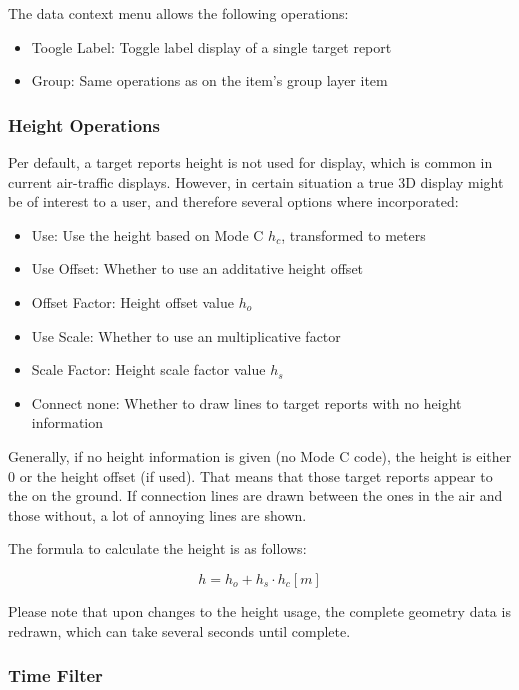 \documentclass[10pt,letterpaper,extrafontsizes]{memoir}
\begin{document}
{The data context menu allows the following operations:

\begin{itemize}
 \item Toogle Label: Toggle label display of a single target report
 \item Group: Same operations as on the item's group layer item
\end{itemize}

\subsubsection{Height Operations}

Per default, a target reports height is not used for display, which is common in current air-traffic displays. However, in certain situation a true 3D display might be of interest to a user, and therefore several options where incorporated:

\begin{itemize}
 \item Use: Use the height based on Mode C $h_c$, transformed to meters
 \item Use Offset: Whether to use an additative height offset
 \item Offset Factor: Height offset value $h_o$
 \item Use Scale: Whether to use an multiplicative factor
 \item Scale Factor: Height scale factor value $h_s$
 \item Connect none: Whether to draw lines to target reports with no height information
\end{itemize}

Generally, if no height information is given (no Mode C code), the height is either $0$ or the height offset (if used). That means that those target reports appear to the on the ground. If connection lines are drawn between the ones in the air and those without, a lot of annoying lines are shown.

The formula to calculate the height is as follows:

$$ h = h_o + h_s \cdot h_c [m]$$ 

Please note that upon changes to the height usage, the complete geometry data is redrawn, which can take several seconds until complete.

\subsubsection{Time Filter}

}
\end{document}
